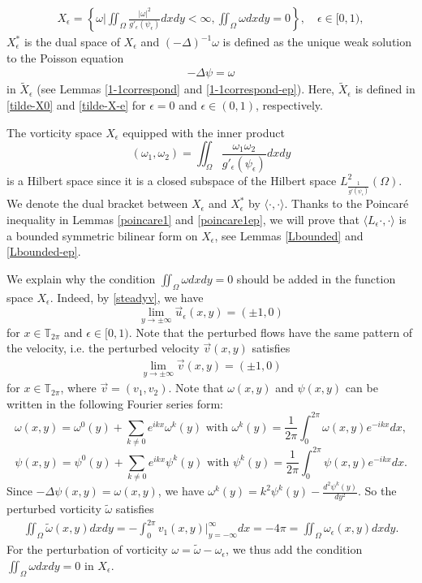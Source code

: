 \documentclass[1 [leqno, 11pt]{amsart}
\numberwithin{equation}{section}
\let\ep=\epsilon
\begin{document}
\begin{CJK*}{GBK}{song}
\begin{align*}
X_\ep = \left\{\omega\bigg| \iint_\Omega \frac{|\omega|^2}{g'_\epsilon(\psi_\epsilon)} dxdy < \infty, \iint_\Omega \omega dxdy = 0 \right\},\quad \epsilon\in[0,1),
\end{align*}
$X_\ep^*$ is the dual space of $X_\ep$ and $(-\Delta)^{-1}\omega$ is defined as the unique weak solution to the Poisson equation
\begin{align}\label{Poisson equation}
-\Delta \psi = \omega
\end{align}
 in $\tilde X_\epsilon$
 (see Lemmas \ref{1-1correspond} and \ref{1-1correspond-ep}).  Here, $\tilde X_\epsilon$ is defined in \eqref{tilde-X0} and \eqref{tilde-X-e} for $\epsilon=0$ and  $\epsilon\in(0,1)$, respectively.


The vorticity space $X_\ep$ equipped with the inner product
$$(\omega_1, \omega_2) = \iint_\Omega \frac{\omega_1\omega_2}{g'_\epsilon(\psi_\epsilon)} dxdy$$ is a Hilbert space since it is a closed subspace of the Hilbert space $L^2_{\frac{1}{g'(\psi_\ep)}}(\Omega).$
We  denote  the dual bracket between $X_\ep$ and $X_\ep^*$ by $\langle \cdot, \cdot \rangle$. Thanks to the Poincar\'e inequality in Lemmas  \ref{poincare1} and \ref{poincare1ep}, we will prove that  $\langle L_\epsilon\cdot,\cdot\rangle$ is  a bounded  symmetric bilinear form on  $X_\ep$, see Lemmas  \ref{Lbounded} and \ref{Lbounded-ep}.


We explain why the condition $\iint_\Omega \omega dxdy = 0$ should be added in the function space $X_\ep$. Indeed,
by \eqref{steadyv}, we have
$$\lim_{y\rightarrow \pm\infty}\vec{u}_\ep(x,y) = (\pm1, 0) $$
 for $x\in\mathbb{T}_{2\pi}$ and $\epsilon\in[0,1)$.
Note that the perturbed flows have the same pattern of the velocity, i.e. the perturbed  velocity  $\vec{v}(x,y)$  satisfies
\begin{align*}\lim_{y\rightarrow \pm\infty}\vec{v}(x,y) = (\pm1, 0) \end{align*}
for $x\in\mathbb{T}_{2\pi}$, where $\vec{v}=(v_1,v_2)$.
Note that $\omega(x,y)$ and $\psi(x,y)$ can be written in the following Fourier series form:
$$\omega(x,y) = \omega^0(y) + \sum_{k\neq 0}e^{ikx}\omega^k(y) \text{ with } \omega^k(y) = \frac{1}{2\pi}\int_{0}^{2\pi} \omega(x,y) e^{-ikx} dx,$$
$$\psi(x,y) = \psi^0(y) + \sum_{k\neq 0}e^{ikx}\psi^k(y) \text{ with } \psi^k(y) = \frac{1}{2\pi}\int_{0}^{2\pi} \psi(x,y) e^{-ikx} dx.$$
Since $-\Delta \psi(x,y) = \omega(x,y)$, we have $\omega^k(y) = k^2\psi^k(y) -\frac{d^2 \psi^k(y)}{dy^2}$.
\fi
So  the perturbed  vorticity $\tilde \omega$ satisfies
\begin{align}\label{perturbed vorticity condition}
  \iint_\Omega \tilde \omega(x,y) dxdy=-\int_0^{2\pi}v_1(x,y)|_{y=-\infty}^\infty dx=-4\pi= \iint_\Omega \omega_\ep(x,y) dxdy.
\end{align}
For the perturbation of  vorticity $\omega=\tilde \omega-\omega_\ep$, we thus add the condition $\iint_\Omega \omega dxdy = 0$  in  $X_\ep$.



\end{CJK*}
\end{document}
